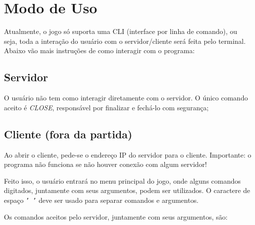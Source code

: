 \documentclass{article}
\begin{document}
\section{Modo de Uso}
    Atualmente, o jogo só suporta uma CLI (interface por linha de comando), ou seja, toda a interação do usuário com o servidor/cliente será feita pelo terminal. Abaixo vão mais instruções de como interagir com o programa:
    \subsection{Servidor}
        O usuário não tem como interagir diretamente com o servidor. O único comando aceito é \emph{CLOSE}, responsável por finalizar e fechá-lo com segurança;
    \subsection{Cliente (fora da partida)}
        Ao abrir o cliente, pede-se o endereço IP do servidor para o cliente. Importante: o programa não funciona se não houver conexão com algum servidor! \par
        Feito isso, o usuário entrará no menu principal do jogo, onde alguns comandos digitados, juntamente com seus argumentos, podem ser utilizados. O caractere de espaço \texttt{' '} deve ser usado para separar comandos e argumentos. \par
        Os comandos aceitos pelo servidor, juntamente com seus argumentos, são:
\end{document}
